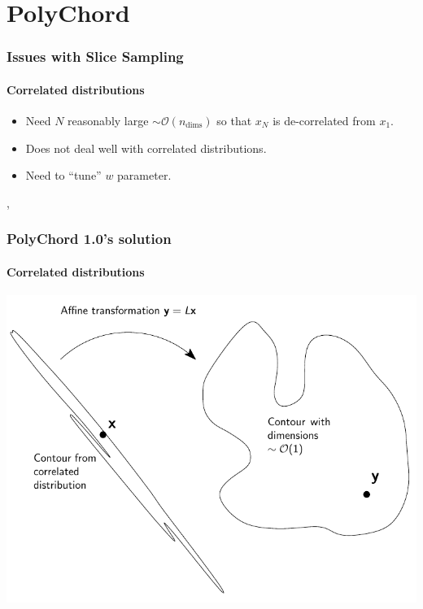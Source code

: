 \documentclass[%
]{beamer}
\begin{document}
\section{PolyChord}


\begin{frame}
  \frametitle{Issues with Slice Sampling}
  \framesubtitle{Correlated distributions}

  \begin{itemize}
    \pause\item Need $N$ reasonably large $\sim\mathcal{O}(n_\mathrm{dims})$ so that $x_N$ is de-correlated from $x_1$.
    \pause\item Does not deal well with correlated distributions.
    \pause\item Need to ``tune'' $w$ parameter.
  \end{itemize}
\end{frame}

\begin{frame}
,   \frametitle{PolyChord 1.0's solution}
  \framesubtitle{Correlated distributions}

  \includegraphics[width=\textwidth]{figures/contour_transform}

\end{frame}
\end{document}
